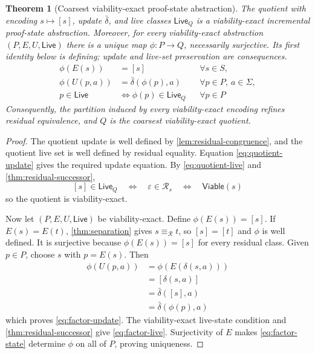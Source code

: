 \documentclass[11pt]{article}
\newtheorem{theorem}{Theorem}[section]
\theoremstyle{definition}
\newcommand{\States}{S}
\newcommand{\Additions}{\Sigma}
\newcommand{\Viable}{\mathsf{Viable}}
\newcommand{\Residual}{\mathcal R}
\newcommand{\ProofStates}{P}
\newcommand{\Live}{\mathsf{Live}}
\newcommand{\Encode}{E}
\newcommand{\Update}{U}
\newcommand{\ResidualEq}{\equiv_{\Residual}}
\newcommand{\eps}{\varepsilon}
\begin{document}
\begin{theorem}[Coarsest viability-exact proof-state abstraction]\label{thm:coarsest}
The quotient with encoding $s\mapsto[s]$, update $\bar\delta$, and live classes
$\Live_Q$ is a viability-exact incremental proof-state abstraction. Moreover,
for every viability-exact abstraction $(\ProofStates,\Encode,\Update,\Live)$
there is a unique map $\phi:\ProofStates\to Q$, necessarily surjective. Its
first identity below is defining; update and live-set preservation are
consequences.
\begin{align}
  \phi(\Encode(s))
    &=[s]
    &&\forall s\in\States,
    \label{eq:factor-state}\\
  \phi(\Update(p,a))
    &=\bar\delta(\phi(p),a)
    &&\forall p\in\ProofStates,\ a\in\Additions,
    \label{eq:factor-update}\\
  p\in\Live
    &\Longleftrightarrow\phi(p)\in\Live_Q
    &&\forall p\in\ProofStates
    \label{eq:factor-live}
\end{align}
Consequently, the partition induced by every viability-exact encoding refines
residual equivalence, and $Q$ is the coarsest viability-exact quotient.
\end{theorem}

\begin{proof}
The quotient update is well defined by \cref{lem:residual-congruence}, and
the quotient live set is well defined by residual equality. Equation
\eqref{eq:quotient-update} gives the required update equation. By
\eqref{eq:quotient-live} and \cref{thm:residual-successor},
\[
  [s]\in\Live_Q
  \quad\Longleftrightarrow\quad
  \eps\in\Residual_s
  \quad\Longleftrightarrow\quad
  \Viable(s)
\]
so the quotient is viability-exact.

Now let $(\ProofStates,\Encode,\Update,\Live)$ be viability-exact. Define
$\phi(\Encode(s))=[s]$. If $\Encode(s)=\Encode(t)$,
\cref{thm:separation} gives $s\ResidualEq t$, so $[s]=[t]$ and $\phi$ is well
defined. It is surjective because $\phi(\Encode(s))=[s]$ for every residual class.
Given $p\in\ProofStates$, choose $s$ with $p=\Encode(s)$. Then
\[
\begin{aligned}
  \phi(\Update(p,a))
  &=\phi(\Encode(\delta(s,a)))\\
  &=[\delta(s,a)]\\
  &=\bar\delta([s],a)\\
  &=\bar\delta(\phi(p),a)
\end{aligned}
\]
which proves \eqref{eq:factor-update}. The viability-exact live-state condition
and \cref{thm:residual-successor} give \eqref{eq:factor-live}.
Surjectivity of $\Encode$ makes \eqref{eq:factor-state} determine $\phi$ on all
of $\ProofStates$, proving uniqueness.
\end{proof}
\end{document}
